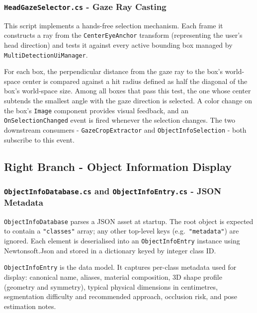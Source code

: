 \documentclass{article}
\begin{document}
\subsubsection{\texttt{HeadGazeSelector.cs} - Gaze Ray Casting}

This script implements a hands-free selection mechanism. Each frame it constructs a ray from the \texttt{CenterEyeAnchor} transform (representing the user's head direction) and tests it against every active bounding box managed by \texttt{MultiDetectionUiManager}.

For each box, the perpendicular distance from the gaze ray to the box's world-space center is compared against a hit radius defined as half the diagonal of the box's world-space size. Among all boxes that pass this test, the one whose center subtends the smallest angle with the gaze direction is selected. A color change on the box's \texttt{Image} component provides visual feedback, and an \texttt{OnSelectionChanged} event is fired whenever the selection changes. The two downstream consumers - \texttt{GazeCropExtractor} and \texttt{ObjectInfoSelection} - both subscribe to this event.

\subsection{Right Branch - Object Information Display}

\subsubsection{\texttt{ObjectInfoDatabase.cs} and \texttt{ObjectInfoEntry.cs} - JSON Metadata}

\texttt{ObjectInfoDatabase} parses a JSON asset at startup. The root object is expected to contain a \texttt{"classes"} array; any other top-level keys (e.g.\ \texttt{"metadata"}) are ignored. Each element is deserialised into an \texttt{ObjectInfoEntry} instance using Newtonsoft.Json and stored in a dictionary keyed by integer class ID.

\texttt{ObjectInfoEntry} is the data model. It captures per-class metadata used for display: canonical name, aliases, material composition, 3D shape profile (geometry and symmetry), typical physical dimensions in centimetres, segmentation difficulty and recommended approach, occlusion risk, and pose estimation notes.
\end{document}
